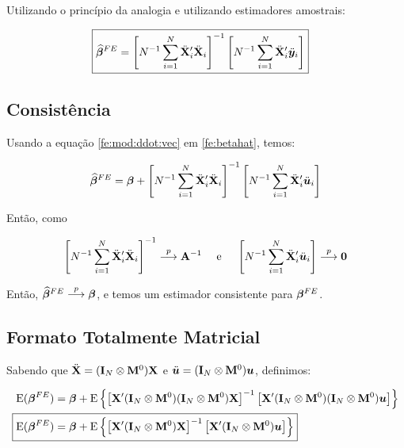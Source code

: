 \documentclass[11pt, oneside, a4paper, article]{article}
\numberwithin{equation}{section}
\begin{document}
Utilizando o princípio da analogia e utilizando estimadores amostrais:

\vspace{-1 em}
\begin{align} \label{fe:betahat}
\Aboxed{
\betavechat^{FE} =
\left[ N^{-1} \sum_{i=1}^{N} \ddot{\Xmat}_{i}' \ddot{\Xmat}_{i} \right]^{-1}
\left[ N^{-1} \sum_{i=1}^{N} \ddot{\Xmat}_{i}' \ddot{\yvec}_{i} \right]
}
\end{align}

\subsection{Consistência}

Usando a equação \eqref{fe:mod:ddot:vec} em \eqref{fe:betahat}, temos:

\vspace{-1 em}
\begin{align*} 
\widehat{\boldsymbol{\beta}}^{FE} =
\boldsymbol{\beta} +
\left[ N^{-1} \sum_{i=1}^{N} \ddot{\mathbf{X}}_{i}' \ddot{\mathbf{X}}_{i} \right]^{-1}
\left[ N^{-1} \sum_{i=1}^{N} \ddot{\mathbf{X}}_{i}' \ddot{\boldsymbol{u}}_{i} \right]
\end{align*}

Então, como

\vspace{-1 em}
\begin{align*} 
\left[ N^{-1} \sum_{i=1}^{N} \ddot{\mathbf{X}}_{i}' \ddot{\mathbf{X}}_{i} \right]^{-1}
 \overset{p}{\longrightarrow}  \mathbf{A}^{-1}
\quad
\text{ e }
\quad
\left[ N^{-1} \sum_{i=1}^{N} \ddot{\mathbf{X}}_{i}' \ddot{\boldsymbol{u}}_{i} \right]
 \overset{p}{\longrightarrow}  \boldsymbol{0}
\end{align*}

\noindent
Então,
$\widehat{\boldsymbol{\beta}}^{FE}  \overset{p}{\longrightarrow}  \boldsymbol{\beta}$,
e temos um estimador consistente para $\boldsymbol{\beta}^{FE}$.

\subsection{Formato Totalmente Matricial}

\noindent
Sabendo que 
$\ddot{\mathbf{X}} = ( \mathbf{I}_{N} \otimes \mathbf{M}^{0} ) \mathbf{X}$
e
$\ddot{\boldsymbol{u}} = ( \mathbf{I}_{N} \otimes \mathbf{M}^{0} ) \boldsymbol{u}$,
definimos:

\vspace{-1 em}
\begin{align*}
\E( \betavec^{FE} ) &=
\betavec +
\E \left\{
\left[  
\Xmat' ( \Imat_{N} \otimes \Mzero )( \Imat_{N} \otimes \Mzero ) \Xmat 
\right]^{-1}
\left[ 
\Xmat' ( \Imat_{N} \otimes \Mzero )( \Imat_{N} \otimes \Mzero ) \uvec
\right]
\right\}
\\
\Aboxed{
\E( \betavec^{FE} ) &=
\betavec +
\E \left\{
\left[  
\Xmat' ( \Imat_{N} \otimes \Mzero ) \Xmat 
\right]^{-1}
\left[ 
\Xmat' ( \Imat_{N} \otimes \Mzero ) \uvec
\right]
\right\} }
\end{align*}
\end{document}
